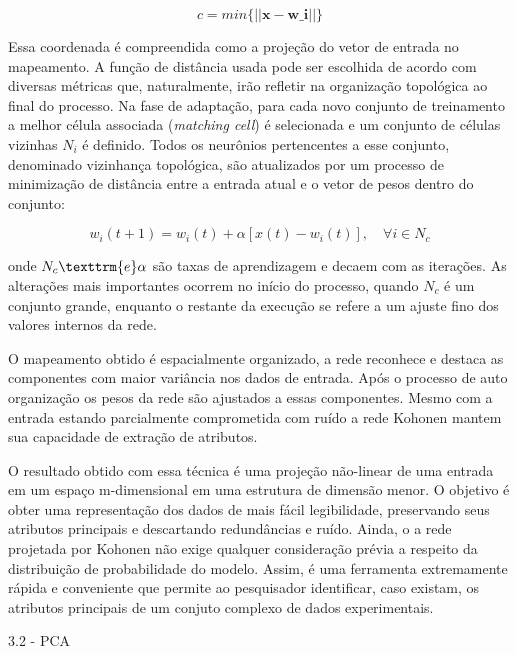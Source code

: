 $$c = min\{|| \textbf{x} - \textbf{w_i} || \} $$

Essa coordenada é compreendida como a projeção do vetor de entrada no mapeamento. A função de distância usada pode ser escolhida de acordo com diversas métricas que, naturalmente, irão refletir na organização topológica ao final do processo. Na fase de adaptação, para cada novo conjunto de treinamento a melhor célula associada (\textit{matching cell}) é selecionada e um conjunto de células vizinhas \textit{$N_i$} é definido. Todos os neurônios pertencentes a esse conjunto, denominado vizinhança topológica, são atualizados por um processo de minimização de distância entre a entrada atual e o vetor de pesos dentro do conjunto:

$$ w_i(t+1) = w_i(t) + \alpha[x(t) - w_i(t)], \quad \forall i \in N_c $$

onde $N_c \texttrm{e} \alpha$ são taxas de aprendizagem e decaem com as iterações. As alterações mais importantes ocorrem no início do processo, quando $N_c$ é um conjunto grande, enquanto o restante da execução se refere a um ajuste fino dos valores internos da rede.

O mapeamento obtido é espacialmente organizado, a rede reconhece e destaca as componentes com maior variância nos dados de entrada. Após o processo de auto organização os pesos da rede são ajustados a essas componentes. Mesmo com a entrada estando parcialmente comprometida com ruído a rede Kohonen mantem sua capacidade de extração de atributos.

O resultado obtido com essa técnica é uma projeção não-linear de uma entrada em um espaço m-dimensional em uma estrutura de dimensão menor. O objetivo é obter uma representação dos dados de mais fácil legibilidade, preservando seus atributos principais e descartando redundâncias e ruído. Ainda, o a rede projetada por Kohonen não exige qualquer consideração prévia a respeito da distribuição de probabilidade do modelo. Assim, é uma ferramenta extremamente rápida e conveniente que permite ao pesquisador identificar, caso existam, os atributos principais de um conjuto complexo de dados experimentais.

3.2 - PCA 

